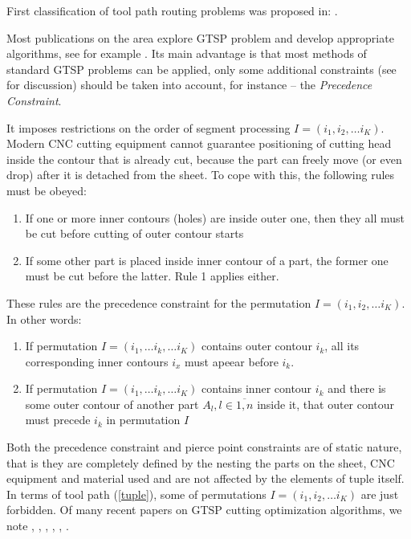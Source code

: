 \documentclass{ifacconf}
\begin{document}
First classification of tool path routing problems
was proposed in:
\cite{Hoeft1997Sep}.

Most publications on the area explore GTSP problem
and develop appropriate algorithms,
see for example \cite{Helsgaun2015Sep}.
Its main advantage is that most methods
of standard GTSP problems can be applied,
only some additional constraints
(see \cite{Petunin2016Dec} for discussion)
should be
taken into account,
for instance --
the \textit{Precedence Constraint}.

It imposes restrictions on the order of
segment processing
$I = (i_1, i_2, \dots i_K)$.
Modern CNC cutting equipment cannot guarantee
positioning of cutting head inside the contour
that is already cut,
because the part can freely move
(or even drop)
after it is detached from the sheet.
To cope with this,
the following rules must be obeyed:

\begin{enumerate}
    \item{If one or more inner contours (holes) are inside outer one,
    then they all must be cut before cutting of outer contour starts
    }
    \item{If some other part is placed inside
    inner contour of a part,
    the former one must be cut before the latter.
    Rule 1 applies either.}
\end{enumerate}
These rules are the precedence constraint
for the permutation
$I = (i_1, i_2, \dots i_K)$.
In other words:
\begin{enumerate}
    \item{If permutation
    $I = (i_1, \dots i_k, \dots i_K)$
    contains outer contour $i_k$,
    all its corresponding inner contours $i_x$
    must apeear before $i_k$.
    }
    \item{If permutation
    $I = (i_1, \dots i_k, \dots i_K)$
    contains inner contour $i_k$
    and there is some outer contour
    of another part $A_l, l \in \overline{1,n}$
    inside it,
    that outer contour must precede $i_k$
    in permutation $I$}
\end{enumerate}

Both the precedence constraint
and pierce point constraints
are of static nature,
that is they are completely defined by
the nesting the parts on the sheet,
CNC equipment and material used
and are not affected by the elements
of tuple itself.
In terms of tool path
(\ref{tuple}),
some of permutations
$I = (i_1, i_2, \dots i_K)$
are just forbidden.
Of many recent papers
on GTSP cutting optimization algorithms,
we note
\cite{Vicencio2014Sep},
\cite{dewil2014construction},
\cite{yu2014route},
\cite{Karapetyan2012Jun},
\cite{Yang2010},
\cite{d2003tool}.
\end{document}
